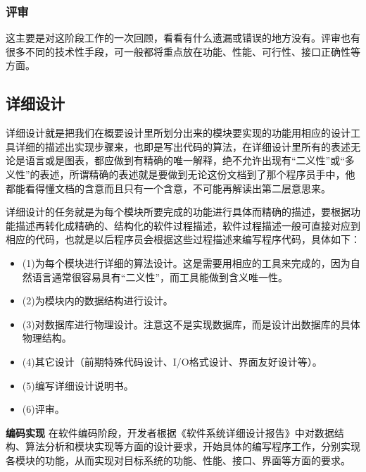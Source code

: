 \documentclass[UTF8,nofonts]{ctexart}
\makeatletter
\renewcommand{\section}{\@startsection{section}{1}{0mm}
  {-\baselineskip}{0.5\baselineskip}{\fontsize{16pt}{16pt}\bf\leftline}}
\makeatother
\begin{document}
\subsubsection{评审}
这主要是对这阶段工作的一次回顾，看看有什么遗漏或错误的地方没有。评审也有很多不同的技术性手段，可一般都将重点放在功能、性能、可行性、接口正确性等方面。
\subsection{\textbf{详细设计}}
详细设计就是把我们在概要设计里所划分出来的模块要实现的功能用相应的设计工具详细的描述出实现步骤来，也即是写出代码的算法，在详细设计里所有的表述无论是语言或是图表，都应做到有精确的唯一解释，绝不允许出现有“二义性”或“多义性”的表述，所谓精确的表述就是要做到无论这份文档到了那个程序员手中，他都能看得懂文档的含意而且只有一个含意，不可能再解读出第二层意思来。

详细设计的任务就是为每个模块所要完成的功能进行具体而精确的描述，要根据功能描述再转化成精确的、结构化的软件过程描述，软件过程描述一般可直接对应到相应的代码，也就是以后程序员会根据这些过程描述来编写程序代码，具体如下：
\begin{itemize}
\setlength{\itemsep}{0pt}
\setlength{\parskip}{0pt}
\setlength{\parsep}{0pt}
\item (1)为每个模块进行详细的算法设计。这是需要用相应的工具来完成的，因为自然语言通常很容易具有“二义性”，而工具能做到含义唯一性。
\item	(2)为模块内的数据结构进行设计。
\item	(3)对数据库进行物理设计。注意这不是实现数据库，而是设计出数据库的具体物理结构。
\item	(4)其它设计（前期特殊代码设计、I/O格式设计、界面友好设计等）。
\item	(5)编写详细设计说明书。
\item	(6)评审。
\end{itemize}
\section{\textbf{编码实现}}
在软件编码阶段，开发者根据《软件系统详细设计报告》中对数据结构、算法分析和模块实现等方面的设计要求，开始具体的编写程序工作，分别实现各模块的功能，从而实现对目标系统的功能、性能、接口、界面等方面的要求。
\end{document}
